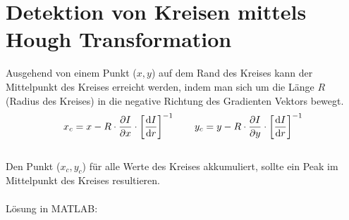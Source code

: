 \section{Detektion von Kreisen mittels Hough Transformation}
Ausgehend von einem Punkt ($x,y$) auf dem Rand des Kreises kann der Mittelpunkt des  Kreises erreicht werden, indem man sich um die Länge $R$ (Radius des Kreises) in die negative Richtung des Gradienten Vektors bewegt.
\[
	x_c = x - R \cdot \frac{\partial I}{\partial x}\cdot \left[\frac{\mathrm{d} I}{\mathrm{d} r} \right]^{-1} \qquad
	y_c = y - R \cdot \frac{\partial I}{\partial y}\cdot \left[\frac{\mathrm{d} I}{\mathrm{d} r} \right]^{-1}
\]
~\\
Den Punkt ($x_c,y_c$) für alle Werte des Kreises akkumuliert, sollte ein Peak im Mittelpunkt des Kreises resultieren.
~\\\\
Lösung in MATLAB:
\lstset{language=Matlab}

~\\